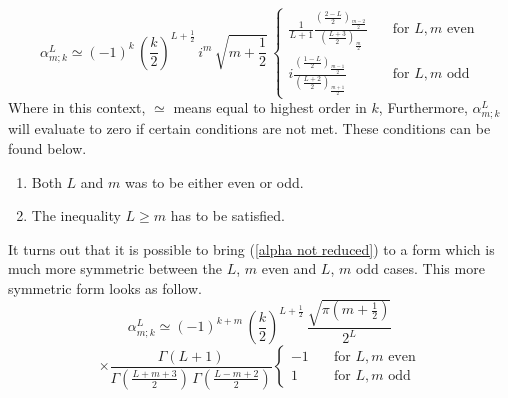 %
%
\begin{equation}\label{alpha not reduced}
\alpha_{m;k}^L
\simeq
(-1)^k \, 
\left( \frac{k}{2} \right)^{L + \frac{1}{2}} \, 
i^m \, \sqrt{m + \frac{1}{2}} \,
\begin{cases}
		\frac{1}{L+1}
		\frac{\left( \frac{2-L}{2} \right)_{\frac{m-2}{2}}}
		{\left( \frac{L+3}{2} \right)_{\frac{m}{2}}}
		& \quad \text{for } L,m \text{ even} \\
		
    	i
		\frac{\left( \frac{1-L}{2} \right)_{\frac{m-1}{2}}}
		{\left( \frac{L+2}{2} \right)_{\frac{m+1}{2}}}
    	& \quad \text{for } L,m \text{ odd}
  \end{cases}
\end{equation}
%
%
Where in this context, $\simeq$ means equal to highest order in $k$, Furthermore, $\alpha_{m;k}^L$ will evaluate to zero if certain conditions are not met. These conditions can be found below.
%
%
\begin{enumerate}
%
\item Both $L$ and $m$ was to be either even or odd.
%
\item The inequality $L \geq m$ has to be satisfied.
%
\end{enumerate}
%
%
It turns out that it is possible to bring (\ref{alpha not reduced}) to a form which is much more symmetric between the $L$, $m$ even and $L$, $m$ odd cases. This more symmetric form looks as follow.
%
%
\begin{equation*}
\alpha_{m;k}^L
\simeq
(-1)^{k + m} \, 
\left( \frac{k}{2} \right)^{L + \frac{1}{2}} \,
\frac{\sqrt{\pi \left( m + \frac{1}{2} \right)}}{2^L}
\end{equation*}
%
%
\begin{equation}
\times
\frac{\Gamma(L+1)}
{
\Gamma \left( \frac{L+m+3}{2} \right) \,
\Gamma \left( \frac{L-m+2}{2} \right)
}
\begin{cases}
		-1
		& \quad \text{for } L,m \text{ even} \\
		
    	1
    	& \quad \text{for } L,m \text{ odd}
  \end{cases}
\end{equation}
%
%
%
%
